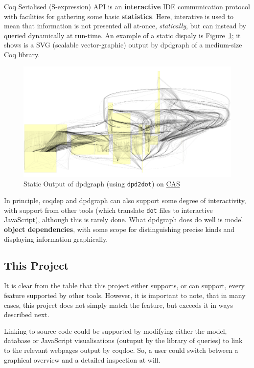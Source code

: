 Coq Serialised (S-expression) API is an \textbf{interactive} IDE communication
protocol with facilities for gathering some basic \textbf{statistics}. Here,
interative is used to mean that information is not presented all at-once,
\emph{statically}, but can instead by queried dynamically at run-time. An
example of a static dispaly is Figure~\ref{fig:static}; it shows is a SVG
(scalable vector-graphic) output by dpdgraph of a medium-size Coq library.

\begin{figure}[p]

  \centering
  \includegraphics[width=\textwidth, page=1]{img/static-CAS-small.pdf}
  \caption{Static Output of dpdgraph (using \texttt{dpd2dot}) on
    \href{https://github.com/Timothy-G-Griffin/CAS}{CAS}}\label{fig:static}

\end{figure}

In principle, coqdep and dpdgraph can also support some degree of interactivity,
with support from other tools (which translate \texttt{dot} files to interactive
JavaScript), although this is rarely done.  What dpdgraph does do well is model
\textbf{object dependencies}, with some scope for distinguishing precise kinds
and displaying information graphically.

\subsection{This Project}

It is clear from the table that this project either supports, or can support,
every feature supported by other tools. However, it is important to note, that
in many cases, this project does not simply match the feature, but exceeds it in
ways described next.

Linking to source code could be supported by modifying either the model,
database or JavaScript visualisations (outuput by the library of queries) to
link to the relevant webpages output by coqdoc. So, a user could switch between
a graphical overview and a detailed inspection at will.

